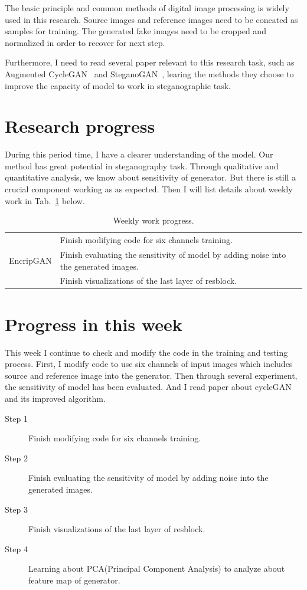 \documentclass[a4paper]{article}
\begin{document}
	The basic principle and common methods of digital image processing is widely used in this research. Source images and reference images need to be concated as samples for training. The generated fake images need to be cropped and normalized in order to recover for next step.
	
	Furthermore, I need to read several paper relevant to this research task, such as Augmented CycleGAN~\cite{zhu2017unpaired} and SteganoGAN~\cite{zhang2019steganogan}, learing the methods they choose to improve the capacity of model to work in steganographic task.
	
	\section{Research progress}
	
	During this period time, I have a  clearer understanding of the model. Our method has great potential in steganography task. Through qualitative and quantitative analysis, we know about sensitivity of generator. But there is still a crucial component working as as expected. Then I will list details about weekly work in Tab.~\ref{t1} below.

	\begin{table}[hb]
		\centering
		\caption{Weekly work progress.}
		\begin{tabular}{c|p{10cm}}
			\hline 
			& Finish modifying code for six channels training.\\
			EncripGAN & Finish evaluating the sensitivity of model by adding noise into the generated images.  \\
			&  Finish visualizations of the last layer of resblock.\\
			\hline
		\end{tabular}
		\label{t1}
	\end{table} 
	
	\section{Progress in this week}
	
	This week I continue to check and modify the code in the training and testing process. First, I modify code to use six channels of input images which includes source and reference image into the generator. Then through several experiment, the sensitivity of model has been evaluated. And I read paper about cycleGAN and its improved algorithm.
	\begin{description}
		\item[Step 1] Finish modifying code for six channels training.\\
		\item[Step 2] Finish evaluating the sensitivity of model by adding noise into the generated images. \\
		\item[Step 3] Finish visualizations of the last layer of resblock.\\
		\item[Step 4] Learning about PCA(Principal Component Analysis) to analyze about feature map of generator.\label{t2}
	\end{description}
	
\end{document}
